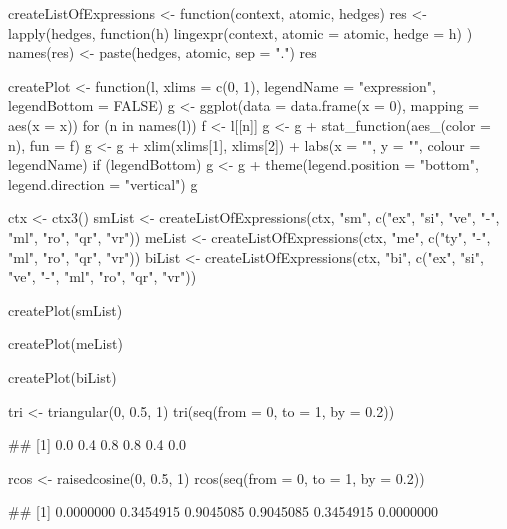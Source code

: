 \documentclass{article}\usepackage[]{graphicx}\usepackage[]{color}
\begin{document}
\begin{Schunk}
\begin{Sinput}
createListOfExpressions <- function(context, atomic, hedges) {
    res <- lapply(hedges, function(h) {
        lingexpr(context, atomic = atomic, hedge = h)
    })
    names(res) <- paste(hedges, atomic, sep = ".")
    res
}

createPlot <- function(l, xlims = c(0, 1), legendName = "expression", legendBottom = FALSE) {
    g <- ggplot(data = data.frame(x = 0), mapping = aes(x = x))
    for (n in names(l)) {
        f <- l[[n]]
        g <- g + stat_function(aes_(color = n), fun = f)
    }
    g <- g + xlim(xlims[1], xlims[2]) + labs(x = "", y = "", colour = legendName)
    if (legendBottom) {
        g <- g + theme(legend.position = "bottom", legend.direction = "vertical")
    }
    g
}

ctx <- ctx3()
smList <- createListOfExpressions(ctx, "sm", c("ex", "si", "ve", "-", "ml", 
    "ro", "qr", "vr"))
meList <- createListOfExpressions(ctx, "me", c("ty", "-", "ml", "ro", "qr", 
    "vr"))
biList <- createListOfExpressions(ctx, "bi", c("ex", "si", "ve", "-", "ml", 
    "ro", "qr", "vr"))

createPlot(smList)
\end{Sinput}
\end{Schunk}

\begin{Schunk}
\begin{Sinput}
createPlot(meList)
\end{Sinput}
\end{Schunk}

\begin{Schunk}
\begin{Sinput}
createPlot(biList)
\end{Sinput}
\end{Schunk}

\begin{Schunk}
% --begin: "triangular"
\begin{Sinput}
tri <- triangular(0, 0.5, 1)
tri(seq(from = 0, to = 1, by = 0.2))
\end{Sinput}
\begin{Soutput}
## [1] 0.0 0.4 0.8 0.8 0.4 0.0
\end{Soutput}
\begin{Sinput}
rcos <- raisedcosine(0, 0.5, 1)
rcos(seq(from = 0, to = 1, by = 0.2))
\end{Sinput}
\begin{Soutput}
## [1] 0.0000000 0.3454915 0.9045085 0.9045085 0.3454915 0.0000000
\end{Soutput}
%
% --end: "triangular"
\end{Schunk}
\end{document}

